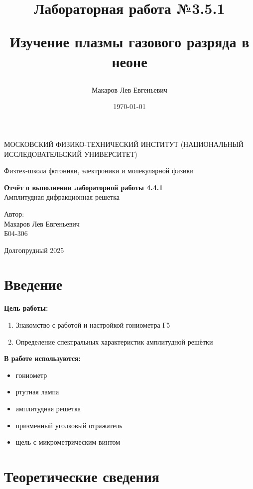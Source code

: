 \documentclass[a4paper,12pt]{article}
\author{Макаров Лев Евгеньевич}
\title{Лабораторная работа №3.5.1

Изучение плазмы газового разряда в неоне
}
\date{\today}
\begin{document}
\begin{titlepage}
	\begin{center}
		{\large МОСКОВСКИЙ ФИЗИКО-ТЕХНИЧЕСКИЙ ИНСТИТУТ (НАЦИОНАЛЬНЫЙ ИССЛЕДОВАТЕЛЬСКИЙ УНИВЕРСИТЕТ)}
	\end{center}
	\begin{center}
		{\large Физтех-школа фотоники, электроники и молекулярной физики}
	\end{center}
	
	
	\vspace{4.5cm}
	{\huge
		\begin{center}
			{\bf Отчёт о выполнении лабораторной работы 4.4.1}\\
			Амплитудная дифракционная решетка
		\end{center}
	}
	\vspace{2cm}
	\begin{flushright}
		{\LARGE Автор:\\ Макаров Лев Евгеньевич \\
			\vspace{0.2cm}
			Б04-306}
	\end{flushright}
	\vspace{8cm}
	\begin{center}
		Долгопрудный 2025
	\end{center}
\end{titlepage}

\section{Введение}

\textbf{Цель работы:} 
\begin{enumerate}
	\item Знакомство с работой и настройкой гониометра Г5
    \item Определение спектральных характеристик амплитудной решётки
\end{enumerate}

\textbf{В работе используются:} 
\begin{itemize}
    \item гониометр
    \item ртутная лампа
    \item амплитудная решетка
    \item призменный уголковый отражатель
    \item щель с микрометрическим винтом
\end{itemize}
\medskip

\section{Теоретические сведения}
\end{document}
